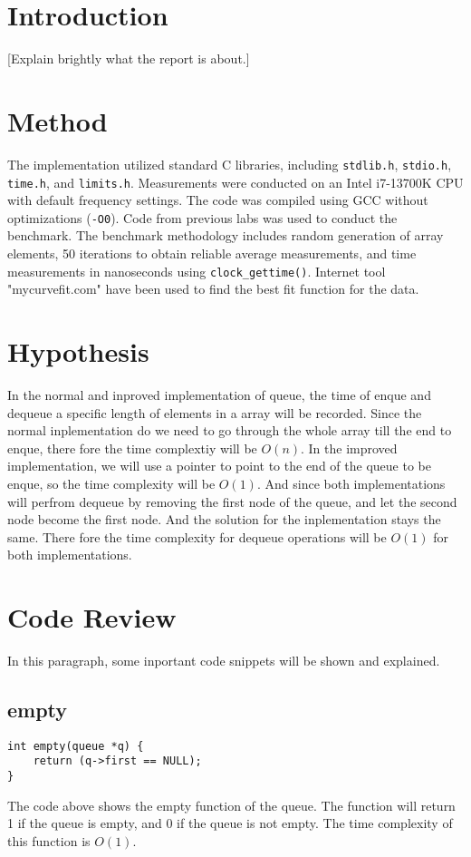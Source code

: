 
\section*{Introduction}
[Explain brightly what the report is about.]

\section*{Method}
The implementation utilized standard C libraries, including \texttt{stdlib.h}, \texttt{stdio.h}, \texttt{time.h}, and \texttt{limits.h}. Measurements were conducted on an Intel i7-13700K CPU with default frequency settings. The code was compiled using GCC without optimizations (\texttt{-O0}). Code from previous labs was used to conduct the benchmark. The benchmark methodology includes random generation of array elements, 50 iterations to obtain reliable average measurements, and time measurements in nanoseconds using \texttt{clock\_gettime()}. Internet tool "mycurvefit.com" have been used to find the best fit function for the data.

\section*{Hypothesis}
In the normal and inproved implementation of queue, the time of enque and dequeue a specific length of elements in a array will be recorded.
Since the normal inplementation do we need to go through the whole array till the end to enque, there fore the time complextiy will be $O(n)$.
In the improved implementation, we will use a pointer to point to the end of the queue to be enque, so the time complexity will be $O(1)$.
And since both implementations will perfrom dequeue by removing the first node of the queue, and let the second node become the first node. And the solution for the inplementation stays the same. There fore the time complexity for dequeue operations will be $O(1)$ for both implementations.


\section*{Code Review}
In this paragraph, some inportant code snippets will be shown and explained.
\subsection*{empty}
\begin{verbatim}
int empty(queue *q) {
    return (q->first == NULL);
}
\end{verbatim}
The code above shows the empty function of the queue. The function will return 1 if the queue is empty, and 0 if the queue is not empty. The time complexity of this function is $O(1)$.

